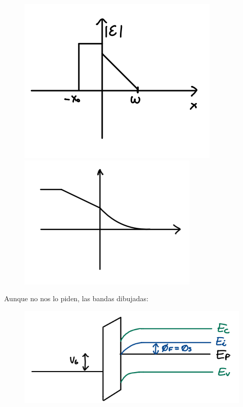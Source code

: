 \begin{enumerate}[label=\alph*)]
	      	\begin{figure}[H]\centering
		      \includegraphics[width=0.45\linewidth]{Ejercicios/Ch_05/Ej_02_a.png} \hfill
		      \includegraphics[width=0.45\linewidth]{Ejercicios/Ch_05/Ej_02_c.png}
			\centering\end{figure}

			Aunque no nos lo piden, las bandas dibujadas:
			\begin{figure}[H]\centering
				\includegraphics[width=0.45\linewidth]{Ejercicios/Ch_05/Ej_02_b.png}
			  \centering\end{figure}
  

\end{enumerate}



\vspace*{2em}



